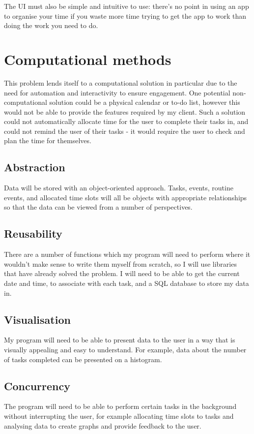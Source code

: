\documentclass{article}
\begin{document}
The UI must also be simple and intuitive to use: there's no point in using an
app to organise your time if you waste more time trying to get the app to work
than doing the work you need to do.

\section{Computational methods}
This problem lends itself to a computational solution in particular due to the
need for automation and interactivity to ensure engagement. One potential
non-computational solution could be a physical calendar or to-do list, however
this would not be able to provide the features required by my client. Such a
solution could not automatically allocate time for the user to complete their
tasks in, and could not remind the user of their tasks - it would require the
user to check and plan the time for themselves.

\subsection{Abstraction}
Data will be stored with an object-oriented approach. Tasks, events, routine
events, and allocated time slots will all be objects with appropriate
relationships so that the data can be viewed from a number of perspectives.

\subsection{Reusability}
There are a number of functions which my program will need to perform where it
wouldn't make sense to write them myself from scratch, so I will use libraries
that have already solved the problem. I will need to be able to get the current
date and time, to associate with each task, and a SQL database to store my data
in.

\subsection{Visualisation}
My program will need to be able to present data to the user in a way that is
visually appealing and easy to understand. For example, data about the number of
tasks completed can be presented on a histogram.

\subsection{Concurrency}
The program will need to be able to perform certain tasks in the background
without interrupting the user, for example allocating time slots to tasks and
analysing data to create graphs and provide feedback to the user.
\end{document}
